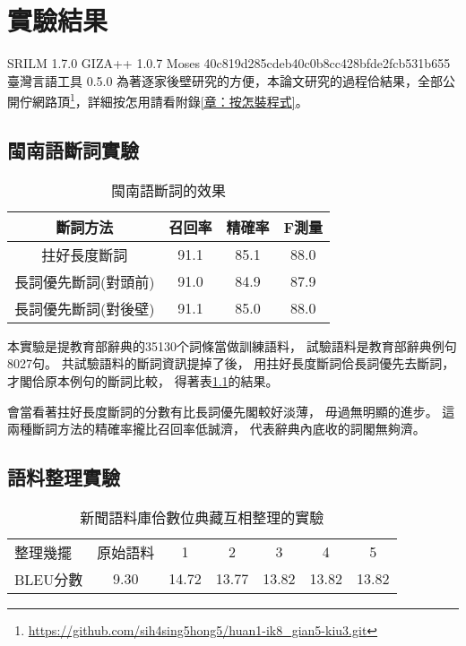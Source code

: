 
\chapter{實驗結果}
\label{章：實驗結果}
SRILM 1.7.0
GIZA++ 1.0.7
Moses 40c819d285cdeb40c0b8cc428bfde2fcb531b655
臺灣言語工具 0.5.0
為著逐家後壁研究的方便，本論文研究的過程佮結果，全部公開佇網路頂\footnote{\url{https://github.com/sih4sing5hong5/huan1-ik8_gian5-kiu3.git}}，詳細按怎用請看附錄\ref{章：按怎裝程式}。

\section{閩南語斷詞實驗}
\label{節：閩南語斷詞實驗}

\begin{table}
\caption{閩南語斷詞的效果}
\label{表：閩南語斷詞的效果}
\centering
\begin{tabular}{c|ccc}
斷詞方法 & 召回率 & 精確率 & F測量\\
\hline
拄好長度斷詞 & 91.1 & 85.1 & 88.0\\
長詞優先斷詞(對頭前) & 91.0 & 84.9 & 87.9\\
長詞優先斷詞(對後壁) & 91.1 & 85.0 & 88.0\\
\end{tabular}
\end{table}

本實驗是提教育部辭典的35130个詞條當做訓練語料，
試驗語料是教育部辭典例句8027句。
共試驗語料的斷詞資訊提掉了後，
用拄好長度斷詞佮長詞優先去斷詞，
才閣佮原本例句的斷詞比較，
得著表\ref{表：閩南語斷詞的效果}的結果。

會當看著拄好長度斷詞的分數有比長詞優先閣較好淡薄，
毋過無明顯的進步。
這兩種斷詞方法的精確率攏比召回率低誠濟，
代表辭典內底收的詞閣無夠濟。

\section{語料整理實驗}
\label{節：語料整理實驗}

\begin{table}
\caption{新聞語料庫佮數位典藏互相整理的實驗}
\label{表：互相整理實驗}
\centering
\begin{tabular}{lcccccc}
整理幾擺 & 原始語料 & 1 & 2 & 3 & 4 & 5\\
BLEU分數 & 9.30 & 14.72 & 13.77 & 13.82 & 13.82 & 13.82\\
\end{tabular}
\end{table}

